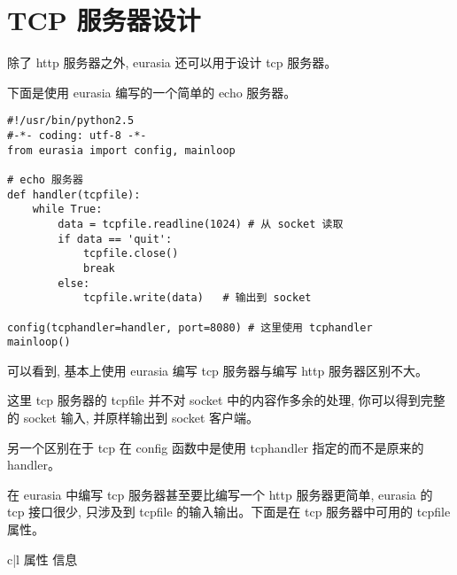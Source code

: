 \documentclass{manual}
\begin{document}



\section{TCP 服务器设计}

除了 http 服务器之外, eurasia 还可以用于设计 tcp 服务器。

下面是使用 eurasia 编写的一个简单的 echo 服务器。

\begin{verbatim}
#!/usr/bin/python2.5
#-*- coding: utf-8 -*-
from eurasia import config, mainloop

# echo 服务器
def handler(tcpfile):
	while True:
		data = tcpfile.readline(1024) # 从 socket 读取
		if data == 'quit':
			tcpfile.close()
			break
		else:
			tcpfile.write(data)   # 输出到 socket

config(tcphandler=handler, port=8080) # 这里使用 tcphandler
mainloop()
\end{verbatim}

可以看到, 基本上使用 eurasia 编写 tcp 服务器与编写 http 服务器区别不大。

这里 tcp 服务器的 tcpfile 并不对 socket 中的内容作多余的处理,
你可以得到完整的 socket 输入, 并原样输出到 socket 客户端。

另一个区别在于 tcp 在 config 函数中是使用 tcphandler 指定的而不是原来的 handler。

在 eurasia 中编写 tcp 服务器甚至要比编写一个 http 服务器更简单,
eurasia 的 tcp 接口很少, 只涉及到 tcpfile 的输入输出。下面是在 tcp 服务器中可用的 tcpfile 属性。

\begin{tableii}{c|l}{}{ 属性 }{ 信息 }
\end{tableii}
\end{document}
